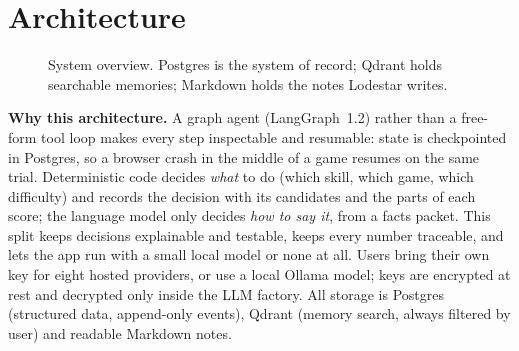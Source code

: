 \documentclass[10pt,a4paper]{article}
\begin{document}
\section{Architecture}
\begin{figure}[h]
\centering
{}
\caption{System overview. Postgres is the system of record; Qdrant holds searchable memories; Markdown holds the notes Lodestar writes.}
\label{fig:arch}
\end{figure}

\textbf{Why this architecture.} A graph agent (LangGraph~1.2) rather than a free-form tool loop makes
every step inspectable and resumable: state is checkpointed in Postgres, so a browser crash in the
middle of a game resumes on the same trial. Deterministic code decides \emph{what} to do (which skill,
which game, which difficulty) and records the decision with its candidates and the parts of each score;
the language model only decides \emph{how to say it}, from a facts packet. This split keeps decisions
explainable and testable, keeps every number traceable, and lets the app run with a small local model
or none at all. Users bring their own key for eight hosted providers, or use a local Ollama model; keys
are encrypted at rest and decrypted only inside the LLM factory. All storage is Postgres (structured
data, append-only events), Qdrant (memory search, always filtered by user) and readable Markdown notes.
\end{document}
